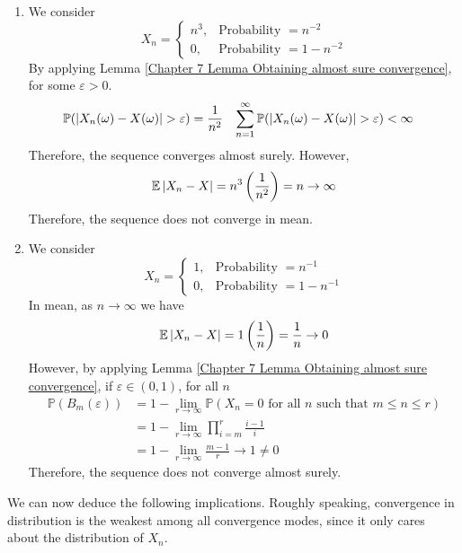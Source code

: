 \documentclass{huhtakm-template-book}
\newcommand{\prob}{\mathbb{P}}
\newcommand{\expect}{\mathbb{E}}
\begin{document}
\begin{proofing}
	\begin{enumerate}
		\item We consider
		\begin{equation*}
			X_{n}=\begin{cases}
				n^{3}, &\text{Probability }=n^{-2}\\
				0, &\text{Probability }=1-n^{-2}
			\end{cases}
		\end{equation*}
		By applying Lemma \ref{Chapter 7 Lemma Obtaining almost sure convergence}, for some $\varepsilon>0$.
		\begin{align*}
			\prob(\abs{X_{n}(\omega)-X(\omega)}>\varepsilon)&=\frac{1}{n^{2}} & \sum_{n=1}^{\infty}\prob(\abs{X_{n}(\omega)-X(\omega)}>\varepsilon)&<\infty
		\end{align*}
		Therefore, the sequence converges almost surely. However,
		\begin{equation*}
			\expect\abs{X_{n}-X}=n^{3}\left(\frac{1}{n^{2}}\right)=n\to\infty
		\end{equation*}
		Therefore, the sequence does not converge in mean.
		\item We consider
		\begin{equation*}
			X_{n}=\begin{cases}
				1, &\text{Probability }=n^{-1}\\
				0, &\text{Probability }=1-n^{-1}
			\end{cases}
		\end{equation*}
		In mean, as $n\to\infty$ we have
		\begin{equation*}
			\expect\abs{X_{n}-X}=1\left(\frac{1}{n}\right)=\frac{1}{n}\to 0
		\end{equation*}
		However, by applying Lemma \ref{Chapter 7 Lemma Obtaining almost sure convergence}, if $\varepsilon\in(0,1)$, for all $n$
		\begin{align*}
			\prob(B_{m}(\varepsilon))&=1-\lim_{r\to\infty}\prob(X_{n}=0\text{ for all }n\text{ such that }m\leq n\leq r)\\
			&=1-\lim_{r\to\infty}\prod_{i=m}^{r}\frac{i-1}{i}\\
			&=1-\lim_{r\to\infty}\frac{m-1}{r}\to 1\neq 0
		\end{align*}
		Therefore, the sequence does not converge almost surely.
	\end{enumerate}
\end{proofing}
We can now deduce the following implications. Roughly speaking, convergence in distribution is the weakest among all convergence modes, since it only cares about the distribution of $X_{n}$.
\end{document}
